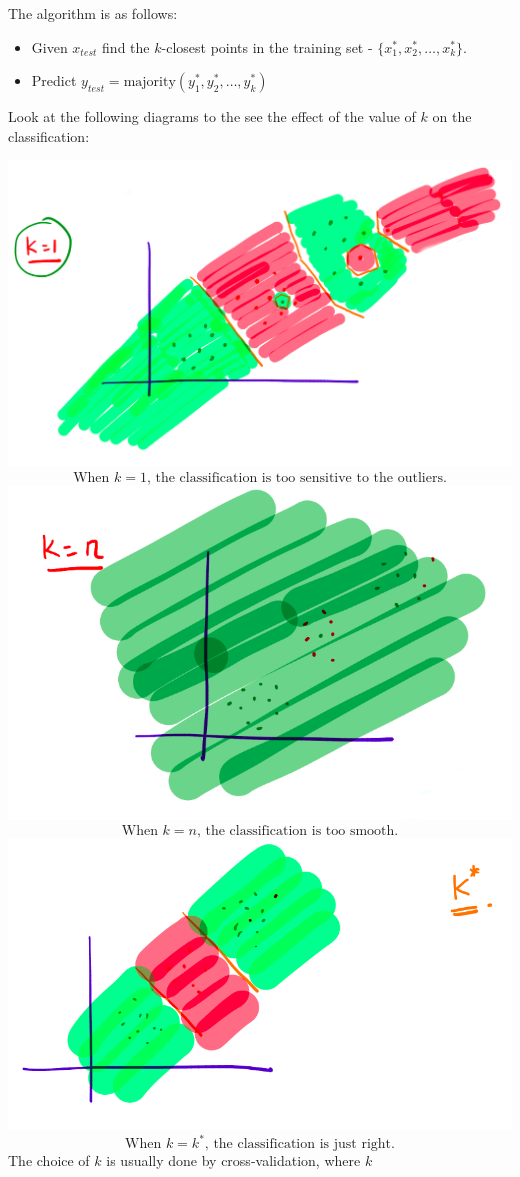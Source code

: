 \documentclass[
]{article}
\providecommand{\tightlist}{%
  \setlength{\itemsep}{0pt}\setlength{\parskip}{0pt}}
\begin{document}
The algorithm is as follows:

\begin{itemize}
\tightlist
\item
  Given \(x_{test}\) find the \(k\)-closest points in the training set -
  \(\{x_1^*, x_2^*, \ldots, x_k^*\}\).
\item
  Predict \(y_{test} = \text{majority}(y_1^*, y_2^*, \ldots, y_k^*)\)
\end{itemize}

Look at the following diagrams to the see the effect of the value of
\(k\) on the classification:

\includegraphics{./images/k1.png} \[
\text{When }k=1\text{, the classification is too sensitive to the outliers.}
\] \includegraphics{./images/kn.png} \[
\text{When }k=n\text{, the classification is too smooth.}
\] \includegraphics{./images/k*.png} \[
\text{When }k=k^*\text{, the classification is just right.}
\] The choice of \(k\) is usually done by cross-validation, where \(k\)
\end{document}

